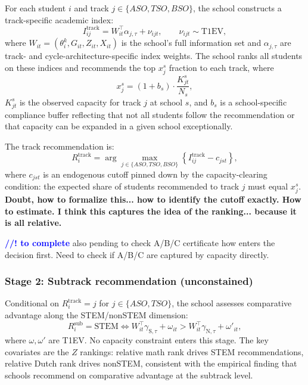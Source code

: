 \documentclass{article}
\begin{document}
For each student $i$ and track $j \in \{ASO, TSO, BSO\}$, the school constructs a track-specific academic index:
\begin{equation}
  I_{ij}^{\mathrm{track}} = W_{it}^\top \alpha_{j,\tau} + \nu_{ijt}, \qquad \nu_{ijt} \sim \text{T1EV},
  \label{eq:track_index}
\end{equation}
where $W_{it} = (\theta^k_i, G_{it}, Z_{it}, X_{it})$ is the school's full information set and $\alpha_{j,\tau}$ are track- and cycle-architecture-specific index weights. The school ranks all students on these indices and recommends the top $x_j^s$ fraction to each track, where
\begin{equation}
  x_j^s = (1 + b_s) \cdot \frac{K_{jt}^s}{N_s},
  \label{eq:capacity_share}
\end{equation}
$K_{jt}^s$ is the observed capacity for track $j$ at school $s$, and $b_s$ is a school-specific compliance buffer reflecting that not all students follow the recommendation or that capacity can be expanded in a given school exceptionally.

The track recommendation is:
\begin{equation}
  R_i^{\mathrm{track}} = \arg\max_{j \in \{ASO, TSO, BSO\}} \left\{  I_{ij}^{\mathrm{track}} - c_{jst} \right\},
  \label{eq:track_rec}
\end{equation}
where $c_{jst}$ is an endogenous cutoff pinned down by the capacity-clearing condition: the expected share of students recommended to track $j$ must equal $x_j^s$. \textbf{Doubt, how to formalize this... how to identify the cutoff exactly. How to estimate. I think this captures the idea of the ranking... because it is all relative.}


\textcolor{blue}{\textbf{//! to complete}} also pending to check A/B/C certificate how enters the decision first. Need to check if A/B/C are captured by capacity directly.

\subsubsection{Stage 2: Subtrack recommendation (unconstained)}

Conditional on $R_i^{\mathrm{track}} = j$ for $j \in \{ASO, TSO\}$, the school assesses comparative advantage along the STEM/nonSTEM dimension:
\begin{equation}
  R_i^{\mathrm{sub}} = \text{STEM} \iff W_{it}^\top \gamma_{\text{S},\tau} + \omega_{it} > W_{it}^\top \gamma_{\text{N},\tau} + \omega'_{it},
  \label{eq:sub_rec}
\end{equation}
where $\omega, \omega'$ are T1EV. No capacity constraint enters this stage. The key covariates are the $Z$ rankings: relative math rank drives STEM recommendations, relative Dutch rank drives nonSTEM, consistent with the empirical finding that schools recommend on comparative advantage at the subtrack level.
\end{document}
